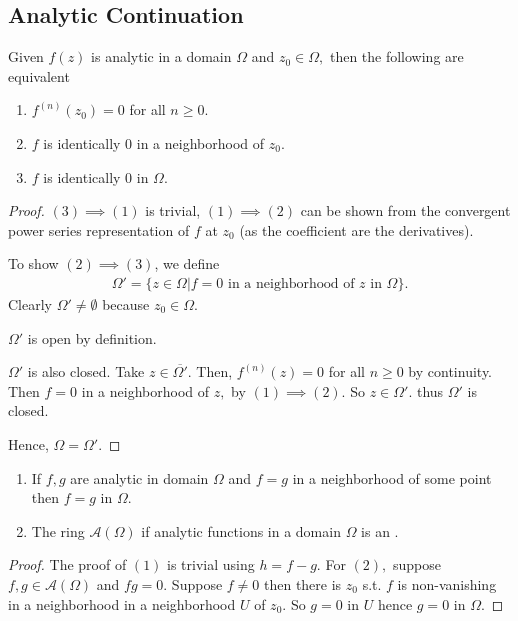 \documentclass[a4paper,12pt]{article}
\begin{document}
\subsection{Analytic Continuation}
\begin{theorem}
    Given $f(z)$ is analytic in a domain $\Omega$ and $z_0\in\Omega,$ then the following are equivalent\begin{enumerate}
        \item $f^{(n)}(z_0)=0$ for all $n\geq 0.$
        \item $f$ is identically $0$ in a neighborhood of $z_0.$
        \item $f$ is identically $0$ in $\Omega.$
    \end{enumerate}
    \begin{proof}
        $(3)\implies(1)$ is trivial, $(1)\implies(2)$ can be shown from the convergent power series representation of $f$ at $z_0$ (as the coefficient are the derivatives).
        
        To show $(2)\implies(3)$, we define \begin{align}
            \Omega'=\{z\in\Omega|f=0\text{ in a neighborhood of }z\text{ in }\Omega\}.
        \end{align}
        Clearly $\Omega'\neq\emptyset$ because $z_0\in\Omega.$

        $\Omega'$ is open by definition.

        $\Omega'$ is also closed. Take $z\in\overline{\Omega'}.$ Then, $f^{(n)}(z)=0$ for all $n\geq 0$ by continuity. Then $f=0$ in a neighborhood of $z,$ by $(1)\implies(2).$ So $z\in\Omega'.$ thus $\Omega'$ is closed. 

        Hence, $\Omega=\Omega'.$
    \end{proof}
    \begin{corollary}
        \begin{enumerate}
            \item If $f,g$ are analytic in domain $\Omega$ and $f=g$ in a neighborhood of some point then $f=g$ in $\Omega.$
            \item The ring $\mathcal A(\Omega)$ if analytic functions in a domain $\Omega$ is an .
        \end{enumerate}
        \begin{proof}
            The proof of $(1)$ is trivial using $h=f-g.$ For $(2),$ suppose $f,g\in\mathcal{A}(\Omega)$ and $fg=0.$ Suppose $f\neq0$ then there is $z_0$ s.t. $f$ is non-vanishing in a neighborhood in a neighborhood $U$ of $z_0.$ So $g=0$ in $U$ hence $g=0$ in $\Omega.$
        \end{proof}
    \end{corollary}
\end{theorem}
\end{document}
